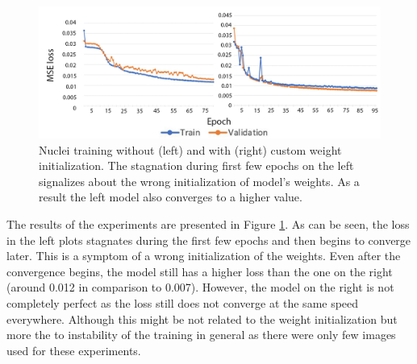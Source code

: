 \begin{figure}[H]
	\begin{center}
		\includegraphics[width=0.8\linewidth]{bilder/nuclei/wi-no-wi.png}
		\caption[Nuclei training without (left) and with (right) custom weight initialization]%
		{Nuclei training without (left) and with (right) custom weight initialization. The stagnation during first few epochs on the left signalizes about the wrong initialization of model's weights. As a result the left model also converges to a higher value.}\label{fig:wi}
	\end{center}
\end{figure}

The results of the experiments are presented in Figure \ref{fig:wi}. As can be seen, the loss in the left plots stagnates during the first few epochs and then begins to converge later. This is a symptom of a wrong initialization of the weights. Even after the convergence begins, the model still has a higher loss than the one on the right (around 0.012 in comparison to 0.007). However, the model on the right is not completely perfect as the loss still does not converge at the same speed everywhere. Although this might be not related to the weight initialization but more the to instability of the training in general as there were only few images used for these experiments.
